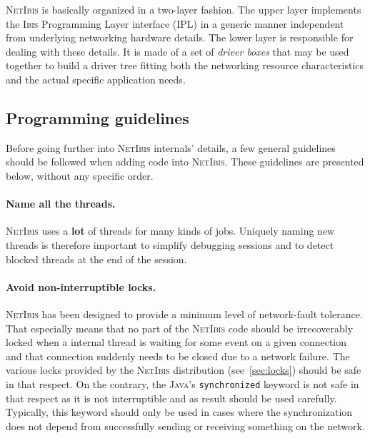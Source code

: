 \documentclass[11pt]{book}
\def\Ibis{\textsc{Ibis}\xspace}
\def\NetIbis{\textsc{NetIbis}\xspace}
\begin{document}
\NetIbis is basically organized in a two-layer fashion. The upper
layer implements the \Ibis Programming Layer interface (IPL) in a
generic manner independent from underlying networking hardware
details. The lower layer is responsible for dealing with these
details. It is made of a set of \emph{driver boxes} that may be used
together to build a driver tree fitting both the networking resource
characteristics and the actual specific application needs.

\subsection{Programming guidelines}
\label{sec:progr-guid}

Before going further into \NetIbis internals' details, a few general
guidelines should be followed when adding code into \NetIbis. These
guidelines are presented below, without any specific order.


\paragraph{Name all the threads.}
\label{sec:name-all-threads}
\NetIbis uses a \textbf{lot} of threads for many kinds of jobs.
Uniquely naming new threads is therefore important to simplify
debugging sessions and to detect blocked threads at the end of the
session.


\paragraph{Avoid non-interruptible locks.}
\label{sec:avoid-non-interr}

\NetIbis has been designed to provide a minimum level of network-fault
tolerance. That especially means that no part of the \NetIbis code
should be irrecoverably locked when a internal thread is waiting for
some event on a given connection and that connection suddenly needs to
be closed due to a network failure. The various locks provided by the
\NetIbis distribution (see~\ref{sec:locks}) should be safe in that
respect. On the contrary, the \textsc{Java}'s \texttt{synchronized}
keyword is not safe in that respect as it is not interruptible and as
result should be used carefully. Typically, this keyword should only
be used in cases where the synchronization does not depend from
successfully sending or receiving something on the network.
\end{document}
